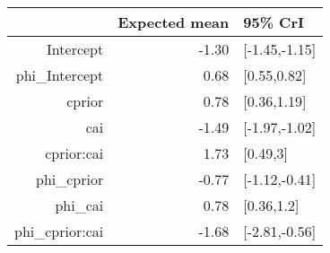 \begin{tabular}{rrl}
  \hline
 & Expected mean & 95\% CrI \\ 
  \hline
Intercept & -1.30 & [-1.45,-1.15] \\ 
  phi\_Intercept & 0.68 & [0.55,0.82] \\ 
  cprior & 0.78 & [0.36,1.19] \\ 
  cai & -1.49 & [-1.97,-1.02] \\ 
  cprior:cai & 1.73 & [0.49,3] \\ 
  phi\_cprior & -0.77 & [-1.12,-0.41] \\ 
  phi\_cai & 0.78 & [0.36,1.2] \\ 
  phi\_cprior:cai & -1.68 & [-2.81,-0.56] \\ 
   \hline
\end{tabular}

